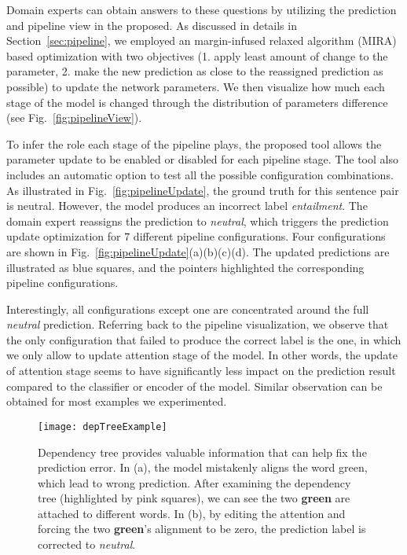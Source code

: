 Domain experts can obtain answers to these questions by utilizing the prediction and pipeline view in the proposed. As discussed in details in Section~\ref{sec:pipeline}, we employed an margin-infused relaxed algorithm (MIRA) based optimization with two objectives (1. apply least amount of change to the parameter, 2. make the new prediction as close to the reassigned prediction as possible) to update the network parameters.
%
We then visualize how much each stage of the model is changed through the distribution of parameters difference (see Fig.~\ref{fig:pipelineView}).

To infer the role each stage of the pipeline plays, the proposed tool allows the parameter update to be enabled or disabled for each pipeline stage.
The tool also includes an automatic option to test all the possible configuration combinations. As illustrated in Fig.~\ref{fig:pipelineUpdate}, the ground truth for this sentence pair is neutral. However, the model produces an incorrect label \emph{entailment}. The domain expert reassigns the prediction to \emph{neutral}, which triggers the prediction update optimization for $7$ different pipeline configurations. Four configurations are shown in Fig.~\ref{fig:pipelineUpdate}(a)(b)(c)(d). The updated predictions are illustrated as blue squares, and the pointers highlighted the corresponding pipeline configurations.

Interestingly, all configurations except one are concentrated around the full \emph{neutral} prediction. Referring back to the pipeline visualization, we observe that the only configuration that failed to produce the correct label is the one, in which we only allow to update attention stage of the model.
%
In other words, the update of attention stage seems to have significantly less impact on the prediction result compared to the classifier or encoder of the model. Similar observation can be obtained for most examples we experimented.

%
\begin{figure*}[t]
\centering
\vspace{-2mm}
 \texttt{[image: depTreeExample]}
  \vspace{-7mm}
 \caption{
Dependency tree provides valuable information that can help fix the prediction error.
In (a), the model mistakenly aligns the word green, which lead to wrong prediction.  
After examining the dependency tree (highlighted by pink squares), we can see the two \textbf{green} are attached to different words.
In (b), by editing the attention and forcing the two \textbf{green}'s alignment to be zero, the prediction label is corrected to \emph{neutral}. 
 }
\label{fig:depTreeExample}
 \vspace{-4mm}
\end{figure*}

